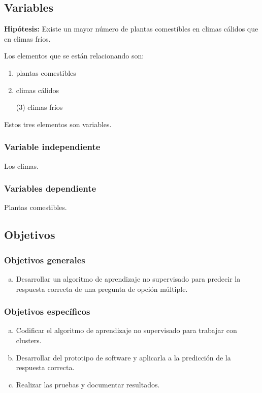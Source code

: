 \documentclass[a4paper, 12pt]{article}
\begin{document}
\subsection{Variables}
{\bf Hipótesis:} Existe un mayor número de plantas comestibles en climas cálidos que en climas fríos. \par 
\vskip 0.2cm
Los elementos que se están relacionando son: \par 
\begin{enumerate} [(1)]
	\item  plantas comestibles
	\item  climas cálidos
	\item[(3)] climas fríos
\end{enumerate} 
Estos tres elementos son variables.

\vskip 0.2cm  
\subsubsection{Variable independiente}
Los climas.

\subsubsection{Variables dependiente}
Plantas comestibles.
\vskip 0.3cm


\subsection{Objetivos}

\subsubsection{Objetivos generales}

\begin{enumerate}[a)]%
	\item Desarrollar un algoritmo de aprendizaje no supervisado para predecir la respuesta correcta de una pregunta de opción múltiple.
\end{enumerate}


\subsubsection{Objetivos específicos}
\begin{enumerate}[a)]
\item Codificar el algoritmo de aprendizaje no supervisado para trabajar con clusters.
\item Desarrollar del prototipo de software y aplicarla a la predicción de la respuesta correcta.
\item Realizar las pruebas y documentar resultados.
\end{enumerate}
\end{document}
